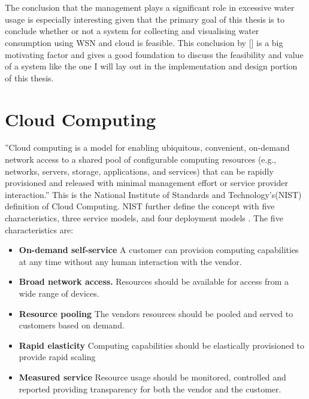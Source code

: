 \documentclass[]{uiophd}
\begin{document}
\\\\
The conclusion that the management plays a significant role in excessive water usage is especially interesting given that the primary goal of this thesis is to conclude whether or not a system for collecting and visualising water consumption using WSN and cloud is feasible. This conclusion by [] is a big motivating factor and gives a good foundation to discuss the feasibility and value of a system like the one I will lay out in the implementation and design portion of this thesis.

\section{Cloud Computing}
''Cloud computing is a model for enabling ubiquitous, convenient, on-demand network access to a shared pool of configurable computing resources (e.g., networks, servers, storage, applications, and services) that can be rapidly provisioned and released with minimal management effort or service provider interaction.''\parencite{Mell:2011:SND:2206223} This is the National Institute of Standards and Technology's(NIST) definition of Cloud Computing. NIST further define the concept with five characteristics, three service models, and four deployment models \parencite{Mell:2011:SND:2206223}. The five characteristics are:
\begin{itemize}
\item \textbf{On-demand self-service} A customer can provision computing capabilities at any time without any human interaction with the vendor.
\item \textbf{Broad network access.} Resources should be available for access from a wide range of devices.
\item \textbf{Resource pooling} The vendors resources should be pooled and served to customers based on demand.
\item \textbf{Rapid elasticity} Computing capabilities should be elastically provisioned to provide rapid scaling 
\item \textbf{Measured service} Resource usage should be monitored, controlled and reported providing transparency for both the vendor and the customer.
\end{itemize}
\end{document}
